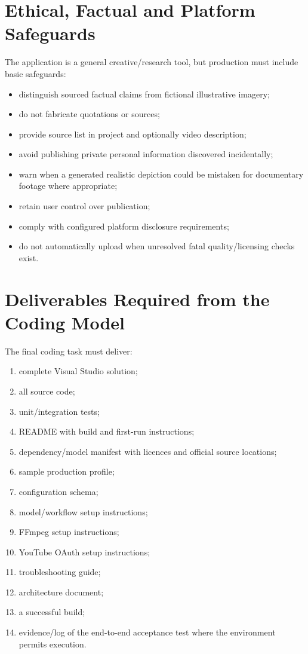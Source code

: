 \documentclass[10pt,journal,compsoc]{IEEEtran}
\begin{document}
\section{Ethical, Factual and Platform Safeguards}

The application is a general creative/research tool, but production must include basic safeguards:
\begin{itemize}
    \item distinguish sourced factual claims from fictional illustrative imagery;
    \item do not fabricate quotations or sources;
    \item provide source list in project and optionally video description;
    \item avoid publishing private personal information discovered incidentally;
    \item warn when a generated realistic depiction could be mistaken for documentary footage where appropriate;
    \item retain user control over publication;
    \item comply with configured platform disclosure requirements;
    \item do not automatically upload when unresolved fatal quality/licensing checks exist.
\end{itemize}

\section{Deliverables Required from the Coding Model}

The final coding task must deliver:
\begin{enumerate}
    \item complete Visual Studio solution;
    \item all source code;
    \item unit/integration tests;
    \item README with build and first-run instructions;
    \item dependency/model manifest with licences and official source locations;
    \item sample production profile;
    \item configuration schema;
    \item model/workflow setup instructions;
    \item FFmpeg setup instructions;
    \item YouTube OAuth setup instructions;
    \item troubleshooting guide;
    \item architecture document;
    \item a successful build;
    \item evidence/log of the end-to-end acceptance test where the environment permits execution.
\end{enumerate}
\end{document}
